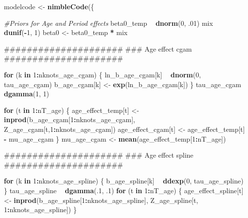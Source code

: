 \documentclass[11pt,]{article}
\newenvironment{Shaded}{\begin{snugshade}}{\end{snugshade}}
\newcommand{\KeywordTok}[1]{\textcolor[rgb]{0.13,0.29,0.53}{\textbf{#1}}}
\newcommand{\DecValTok}[1]{\textcolor[rgb]{0.00,0.00,0.81}{#1}}
\newcommand{\StringTok}[1]{\textcolor[rgb]{0.31,0.60,0.02}{#1}}
\newcommand{\CommentTok}[1]{\textcolor[rgb]{0.56,0.35,0.01}{\textit{#1}}}
\newcommand{\ControlFlowTok}[1]{\textcolor[rgb]{0.13,0.29,0.53}{\textbf{#1}}}
\newcommand{\OperatorTok}[1]{\textcolor[rgb]{0.81,0.36,0.00}{\textbf{#1}}}
\newcommand{\NormalTok}[1]{#1}
\begin{document}
\begin{Shaded}
\begin{Highlighting}[]
\NormalTok{modelcode <-}\StringTok{ }\KeywordTok{nimbleCode}\NormalTok{(\{}

  \CommentTok{#Priors for Age and Period effects}
\NormalTok{  beta0_temp }\OperatorTok{~}\StringTok{ }\KeywordTok{dnorm}\NormalTok{(}\DecValTok{0}\NormalTok{, .}\DecValTok{01}\NormalTok{)}
\NormalTok{  mix }\OperatorTok{~}\StringTok{ }\KeywordTok{dunif}\NormalTok{(}\OperatorTok{-}\DecValTok{1}\NormalTok{, }\DecValTok{1}\NormalTok{)}
\NormalTok{  beta0 <-}\StringTok{ }\NormalTok{beta0_temp }\OperatorTok{*}\StringTok{ }\NormalTok{mix}

\NormalTok{  #####################}
\NormalTok{  ### Age effect cgam}
\NormalTok{  #####################}

  \ControlFlowTok{for}\NormalTok{ (k }\ControlFlowTok{in} \DecValTok{1}\OperatorTok{:}\NormalTok{nknots_age_cgam) \{}
\NormalTok{    ln_b_age_cgam[k] }\OperatorTok{~}\StringTok{ }\KeywordTok{dnorm}\NormalTok{(}\DecValTok{0}\NormalTok{, tau_age_cgam)}
\NormalTok{    b_age_cgam[k] <-}\StringTok{ }\KeywordTok{exp}\NormalTok{(ln_b_age_cgam[k])}
\NormalTok{  \}}
\NormalTok{  tau_age_cgam }\OperatorTok{~}\StringTok{ }\KeywordTok{dgamma}\NormalTok{(}\DecValTok{1}\NormalTok{, }\DecValTok{1}\NormalTok{)}

  \ControlFlowTok{for}\NormalTok{ (t }\ControlFlowTok{in} \DecValTok{1}\OperatorTok{:}\NormalTok{nT_age) \{}
\NormalTok{    age_effect_temp[t] <-}\StringTok{ }\KeywordTok{inprod}\NormalTok{(b_age_cgam[}\DecValTok{1}\OperatorTok{:}\NormalTok{nknots_age_cgam],}
\NormalTok{                                 Z_age_cgam[t,}\DecValTok{1}\OperatorTok{:}\NormalTok{nknots_age_cgam])}
\NormalTok{    age_effect_cgam[t] <-}\StringTok{ }\NormalTok{age_effect_temp[t] }\OperatorTok{-}\StringTok{ }\NormalTok{mu_age_cgam}
\NormalTok{  \}}
\NormalTok{  mu_age_cgam <-}\StringTok{ }\KeywordTok{mean}\NormalTok{(age_effect_temp[}\DecValTok{1}\OperatorTok{:}\NormalTok{nT_age])}

\NormalTok{  #####################}
\NormalTok{  ### Age effect spline}
\NormalTok{  #####################}

  \ControlFlowTok{for}\NormalTok{ (k }\ControlFlowTok{in} \DecValTok{1}\OperatorTok{:}\NormalTok{nknots_age_spline) \{}
\NormalTok{    b_age_spline[k] }\OperatorTok{~}\StringTok{ }\KeywordTok{ddexp}\NormalTok{(}\DecValTok{0}\NormalTok{, tau_age_spline)}
\NormalTok{    \}}
\NormalTok{  tau_age_spline }\OperatorTok{~}\StringTok{ }\KeywordTok{dgamma}\NormalTok{(.}\DecValTok{1}\NormalTok{, .}\DecValTok{1}\NormalTok{)}
  \ControlFlowTok{for}\NormalTok{ (t }\ControlFlowTok{in} \DecValTok{1}\OperatorTok{:}\NormalTok{nT_age) \{}
\NormalTok{    age_effect_spline[t] <-}\StringTok{ }\KeywordTok{inprod}\NormalTok{(b_age_spline[}\DecValTok{1}\OperatorTok{:}\NormalTok{nknots_age_spline],}
\NormalTok{                                   Z_age_spline[t, }\DecValTok{1}\OperatorTok{:}\NormalTok{nknots_age_spline])}
\NormalTok{  \}}


\end{Highlighting}
\end{Shaded}
\end{document}
